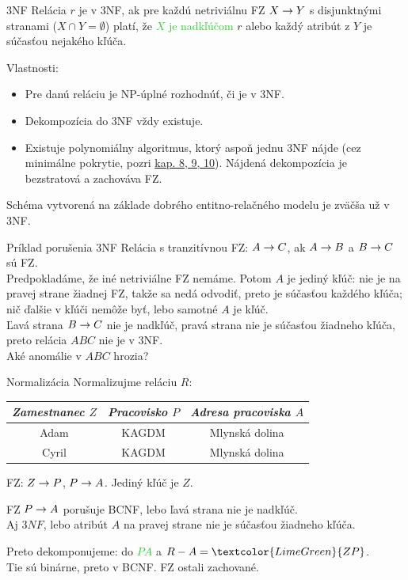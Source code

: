 \documentclass[12pt]{beamer}
\def\green#1{\textcolor{LimeGreen}{#1}}
\begin{document}
\begin{frame}[fragile]{3NF}
Relácia $r$ je v 3NF, ak pre každú netriviálnu FZ $X \rightarrow Y$ s disjunktnými stranami ($X \cap Y = \emptyset$) platí, že \green{$X$ je nadkľúčom} $r$ alebo \alert{každý atribút z $Y$ je súčasťou nejakého kľúča}.

\bigskip
Vlastnosti:
\begin{itemize}
\item Pre danú reláciu je NP-úplné rozhodnúť, či je v 3NF.
\item Dekompozícia do 3NF vždy existuje.
\item Existuje polynomiálny algoritmus, ktorý aspoň jednu 3NF nájde (cez minimálne pokrytie, pozri
{\scriptsize\href{https://www.inf.usi.ch/faculty/soule/teaching/2016-fall/db/cover.pdf}{kap. 8, 9, 10}}).
Nájdená dekompozícia je bezstratová a zachováva FZ.
\end{itemize}

\bigskip
Schéma vytvorená na základe dobrého entitno-relačného modelu je zväčša už v 3NF.
\end{frame}

\begin{frame}[fragile]{Príklad porušenia 3NF}
Relácia s \alert{tranzitívnou} FZ: $A\rightarrow C$, ak $A\rightarrow B$ a $B\rightarrow C$ sú FZ.\\[5mm]
Predpokladáme, že iné netriviálne FZ nemáme.
Potom $A$ je jediný kľúč: nie je na pravej strane žiadnej FZ,
takže sa nedá odvodiť, preto je súčasťou každého kľúča;
nič ďalšie v kľúči nemôže byť, lebo samotné $A$ je kľúč.\\[5mm]

Ľavá strana $B\rightarrow C$ nie je nadkľúč, pravá strana nie je súčasťou žiadneho kľúča,
preto relácia $ABC$ nie je v 3NF.\\[5mm]

Aké anomálie v $ABC$ hrozia?
\end{frame}

\begin{frame}[fragile]{Normalizácia}
Normalizujme reláciu $R$:\\[2mm]
\begin{tabular}{|c|c|c|}
\hline
\emph{Zamestnanec $Z$} & \emph{Pracovisko $P$} & \emph{Adresa pracoviska $A$} \\\hline
Adam & KAGDM & Mlynská dolina \\\hline
Cyril & KAGDM & Mlynská dolina \\\hline
\end{tabular}
\pause

\bigskip
FZ: $Z\rightarrow P$, $P\rightarrow A$. Jediný kľúč je $Z$.

\bigskip
FZ \alert{$P\rightarrow A$} porušuje BCNF, lebo ľavá strana nie je nadkľúč.\\
Aj $3NF$, lebo atribút $A$ na pravej strane nie je súčasťou žiadneho kľúča.

\bigskip
Preto dekomponujeme: do \green{$PA$} a $R - A = \green{ZP}$.\\
Tie sú binárne, preto v BCNF. FZ ostali zachované.
\end{frame}
\end{document}
